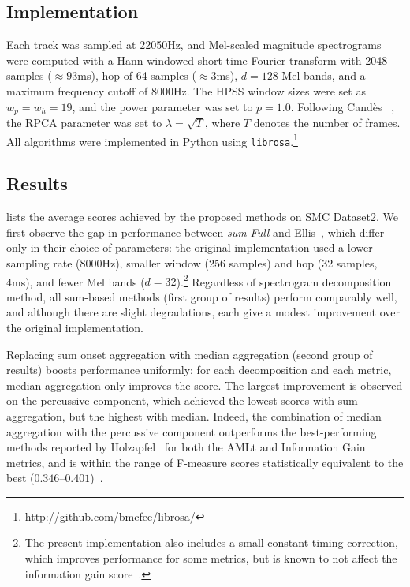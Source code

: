 \documentclass{article}
\begin{document}
\subsection{Implementation}
Each track was sampled at 22050Hz, and Mel-scaled magnitude spectrograms were computed 
with a Hann-windowed short-time Fourier transform with 2048 samples ($\approx93$ms), hop 
of 64 samples ($\approx3$ms), $d=128$ Mel bands, and a maximum frequency cutoff of 8000Hz.
The HPSS window sizes were set as $w_p = w_h = 19$, and the power parameter was set 
to $p=1.0$.
Following Cand\`{e}s \etal~\cite{candes2011robust}, the RPCA parameter was set to
${\lambda = \sqrt{T}}$, where $T$ denotes the number of frames.
All algorithms were implemented in Python using \texttt{librosa}.\footnote{\url{http://github.com/bmcfee/librosa/}}

\subsection{Results}

 lists the average scores achieved by the proposed methods on
SMC Dataset2. 
We first observe the gap in performance between \emph{sum-Full} and 
Ellis~\cite{ellis2007beat}, which differ only in their choice of parameters: the 
original implementation used a lower sampling rate (8000Hz), smaller window (256 samples) 
and hop (32 samples, 4ms), and fewer Mel bands ($d=32$).\footnote{The present
implementation also includes a small constant timing correction, which improves 
performance for some metrics, but is known to not affect the information gain
score~\cite{davies2009evaluation}.}
Regardless of spectrogram decomposition method, all sum-based methods (first group of 
results) perform comparably well, and although there are slight degradations, each give 
a modest improvement over the original implementation.

Replacing sum onset aggregation with median aggregation (second group of results)
boosts performance uniformly: for each decomposition and each metric, median
aggregation only improves the score.  The largest improvement is observed on the
percussive-component, which achieved the lowest scores with sum aggregation, but the
highest with median. Indeed, the combination of median aggregation with the percussive
component outperforms the best-performing methods reported by Holzapfel~\etal{} for both 
the AMLt and Information Gain metrics, and is within the range of F-measure scores 
statistically equivalent to the best ($0.346$--$0.401$)~\cite{holzapfel2012}.
\end{document}
